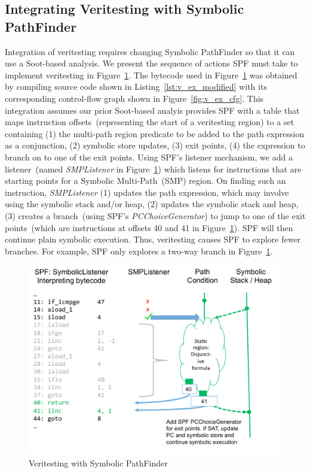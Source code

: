 \subsection{Integrating Veritesting with Symbolic PathFinder}
%
Integration of veritesting requires changing Symbolic PathFinder so that it can
use a Soot-based analysis.
%
We present the sequence of actions SPF must take to implement veritesting in
Figure~\ref{fig:spf_veritesting}.
%
The bytecode used in Figure~\ref{fig:spf_veritesting} was obtained by compiling
source code shown in Listing~\ref{lst:v_ex_modified} with its corresponding
control-flow graph shown in Figure~\ref{fig:v_ex_cfg}.
%
This integration assumes our prior Soot-based analyis provides SPF
with a table that maps instruction offsets~(representing the start of a
veritesting region) to a set containing (1) the multi-path region predicate to be
added to the path expression as a conjunction, (2) symbolic store
updates, (3) exit points, (4) the expression to branch on to one of the exit points.
%
Using SPF\rq s listener mechanism, we add a listener~(named
\textit{SMPListener} in Figure~\ref{fig:spf_veritesting}) which listens for instructions that are starting points for a Symbolic Multi-Path~(SMP) region.
%
On finding such an instruction, \textit{SMPListener}
(1) updates the path expression, which may involve using the symbolic stack and/or heap,
(2) updates the symbolic stack and heap,
(3) creates a branch~(using SPF's \textit{PCChoiceGenerator}) to
jump to one of the exit points~(which are instructions at offsets 40 and
41 in Figure~\ref{fig:spf_veritesting}).
%
SPF will then continue plain symbolic execution.
%
Thus, veritesting causes SPF to explore fewer branches.
%
For example, SPF only explores a two-way branch in Figure~\ref{fig:spf_veritesting}.
%
\begin{figure}[]
\caption{Veritesting with Symbolic PathFinder}
\label{fig:spf_veritesting}
\includegraphics[width=\columnwidth]{figures/spf_veritesting}
\end{figure}
%

